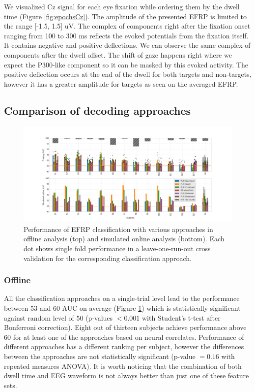 \documentclass[12pt]{iopart}
\begin{document}
We visualized Cz signal for each eye fixation while ordering them
by the dwell time (Figure \ref{fig:epochsCz}).
The amplitude of the presented EFRP is limited to the range [-1.5, 1.5] uV.
The complex of components right after the fixation onset ranging from 100 to 300 ms
reflects the evoked potentials from the fixation itself. It contains
negative and positive deflections. We can observe the same complex of components
after the dwell offset. The shift of gaze happens right where we expect 
the P300-like component so it can be masked by this evoked activity.
The positive deflection occurs at the end of the dwell for both
targets and non-targets, however it has a greater amplitude for targets
as seen on the averaged EFRP.


\subsection{Comparison of decoding approaches}

\begin{figure}[!t]
    \includegraphics[trim={2cm 0cm 2cm 0cm},clip,width=1.1\columnwidth]{../images/ClassificationAll.png}
    \caption{Performance of EFRP classification with various approaches in offline analysis (top)
    and simulated online analysis (bottom). Each dot shows single fold performance
    in a leave-one-run-out cross validation for the corresponding classification approach.}
\label{fig:classAll}
\end{figure}

\subsubsection*{Offline}
All the classification approaches on a single-trial level
lead to the performance between 53 and 60 AUC on average
(Figure \ref{fig:classAll})
which is statistically significant against random level of 50 
(p-values $< 0.001$ with Student's t-test after Bonferroni correction).
Eight out of thirteen subjects achieve performance above 60 for at least one of the approaches based
on neural correlates.
Performance of different approaches has a different ranking per subject, however
the differences between
the approaches are not statistically significant (p-value $= 0.16$ with repeated measures ANOVA).
It is worth noticing that the combination of both dwell time and EEG waveform is not always
better than just one of these feature sets.
\end{document}
